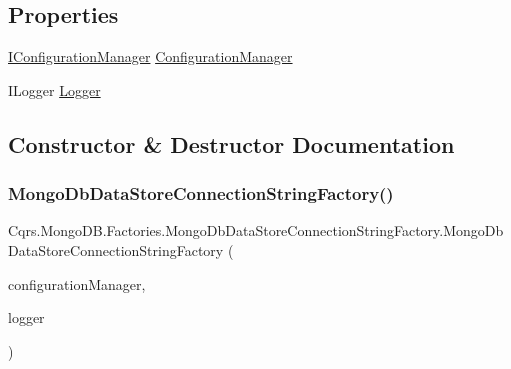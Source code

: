\subsection*{Properties}
\begin{DoxyCompactItemize}
\item 
\hyperlink{interfaceCqrs_1_1Configuration_1_1IConfigurationManager}{I\+Configuration\+Manager} \hyperlink{classCqrs_1_1MongoDB_1_1Factories_1_1MongoDbDataStoreConnectionStringFactory_af39bf5809bdffc1499a995ac1769831a}{Configuration\+Manager}
\item 
I\+Logger \hyperlink{classCqrs_1_1MongoDB_1_1Factories_1_1MongoDbDataStoreConnectionStringFactory_ab2ebea030cc01719042d338712224f50}{Logger}
\end{DoxyCompactItemize}


\subsection{Constructor \& Destructor Documentation}
\mbox{\label{classCqrs_1_1MongoDB_1_1Factories_1_1MongoDbDataStoreConnectionStringFactory_a9ccb753772ee1aa374ad39ba5b93700f}} 
\subsubsection{\texorpdfstring{Mongo\+Db\+Data\+Store\+Connection\+String\+Factory()}{MongoDbDataStoreConnectionStringFactory()}}
{\footnotesize\ttfamily Cqrs.\+Mongo\+D\+B.\+Factories.\+Mongo\+Db\+Data\+Store\+Connection\+String\+Factory.\+Mongo\+Db\+Data\+Store\+Connection\+String\+Factory (\begin{DoxyParamCaption}\item[{\hyperlink{interfaceCqrs_1_1Configuration_1_1IConfigurationManager}{I\+Configuration\+Manager}}]{configuration\+Manager,  }\item[{I\+Logger}]{logger }\end{DoxyParamCaption})}



